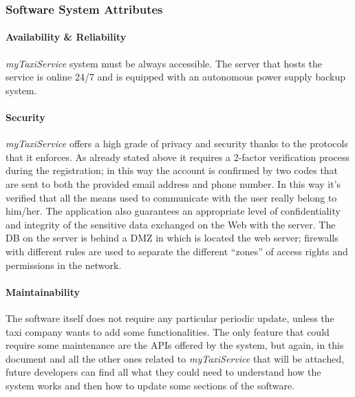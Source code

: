 \documentclass[a4paper,11pt]{report} %
\newcommand{\mts}{\mbox{\normalfont\itshape myTaxiService}}
\begin{document}
	\subsubsection{Software System Attributes}
	
	\paragraph{Availability \& Reliability} \mts{} system must be always accessible. The server that hosts the service is online 24/7 and is equipped with an autonomous power supply backup system.
	
	\paragraph{Security} \mts{} offers a high grade of privacy and security thanks to the protocols that it enforces. As already stated above it requires a 2-factor verification process during the registration; in this way the account is confirmed by two codes that are sent to both the provided email address and phone number. In this way it's verified that  all the means used to communicate with the user really belong to him/her. The application also guarantees an appropriate level of confidentiality and integrity of the sensitive data exchanged on the Web with the server. The DB on the server is behind a DMZ in which is located the web server; firewalls with different rules are used to separate the different ``zones'' of access rights and permissions in the network.
	
	\paragraph{Maintainability} The software itself does not require any particular periodic update, unless the taxi company wants to add some functionalities. The only feature that could require some maintenance are the APIs offered by the system, but again, in this document and all the other ones related to \mts{} that will be attached, future developers can find all what they could need to understand how the system works and then how to update some sections of the software. 

%	
	
\end{document}
